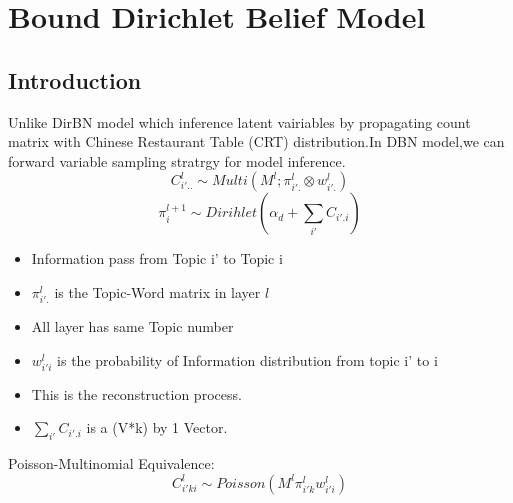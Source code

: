 \chapter{Bound Dirichlet Belief Model}\label{ccl}

\section{Introduction}
Unlike DirBN model which inference latent vairiables by propagating count matrix with Chinese Restaurant Table (CRT)
distribution.In DBN model,we can forward variable sampling stratrgy for model inference.
$$C_{i'..}^{l} \sim Multi(M^l;\pi_{i'.}^l \otimes w_{i'.}^l) \tag{1}$$
$$\pi_i^{l+1} \sim Dirihlet(\alpha_d +\sum_{i'}{C_{i'.i}})\tag{2}$$
\begin{itemize}
  \item Information pass from Topic i' to Topic i
  \item $\pi_{i'.}^l$ is the Topic-Word matrix in layer $l$
  \item All layer has same Topic number
  \item $w_{i'i}^l$ is the probability of Information distribution from topic i' to i
  \item This is the reconstruction process.
  \item  $\sum_{i'}{C_{i'.i}}$  is a (V*k) by 1 Vector.
\end{itemize}

 Poisson-Multinomial Equivalence:
 $$C_{i'ki}^{l} \sim Poisson(M^l \pi_{i'k}^l w_{i'i}^l)\tag{3}$$

